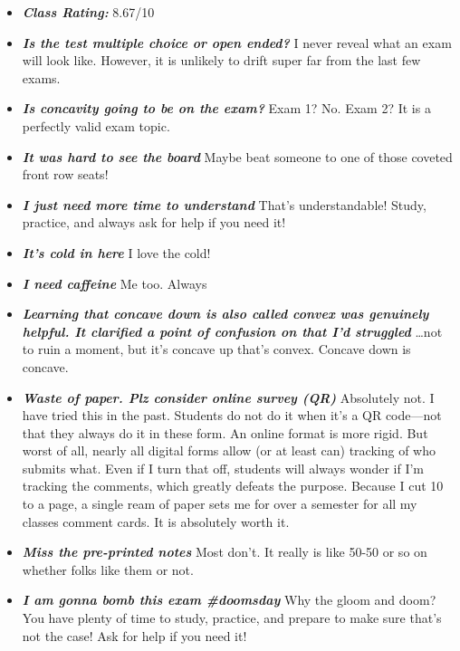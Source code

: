 \documentclass[11pt,letterpaper]{article}
\begin{document}
\begin{itemize}
\item {\bfseries\itshape Class Rating:} 8.67/10

\item {\bfseries\itshape Is the test multiple choice or open ended?} I never reveal what an exam will look like. However, it is unlikely to drift super far from the last few exams.

\item {\bfseries\itshape Is concavity going to be on the exam?} Exam 1? No. Exam 2? It is a perfectly valid exam topic. 

\item {\bfseries\itshape It was hard to see the board} Maybe beat someone to one of those coveted front row seats!

\item {\bfseries\itshape I just need more time to understand} That's understandable!  Study, practice, and always ask for help if you need it!

\item {\bfseries\itshape It's cold in here} I love the cold!

\item {\bfseries\itshape I need caffeine} Me too. Always

\item {\bfseries\itshape Learning that concave down is also called convex was genuinely helpful. It clarified a point of confusion on that I'd struggled} \dots not to ruin a moment, but it's concave up that's convex. Concave down is concave.

\item {\bfseries\itshape Waste of paper. Plz consider online survey (QR)} Absolutely not. I have tried this in the past. Students do not do it when it's a QR code---not that they always do it in these form. An online format is more rigid. But worst of all, nearly all digital forms allow (or at least can) tracking of who submits what. Even if I turn that off, students will always wonder if I'm tracking the comments, which greatly defeats the purpose. Because I cut 10 to a page, a single ream of paper sets me for over a semester for all my classes comment cards. It is absolutely worth it.

\item {\bfseries\itshape Miss the pre-printed notes} Most don't. It really is like 50-50 or so on whether folks like them or not.

\item {\bfseries\itshape I am gonna bomb this exam \#doomsday} Why the gloom and doom? You have plenty of time to study, practice, and prepare to make sure that's not the case! Ask for help if you need it!


\end{itemize}
\end{document}
